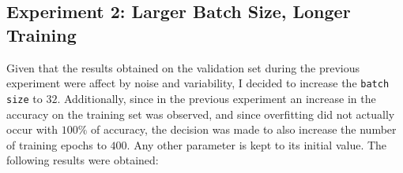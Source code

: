 \documentclass[11pt,a4paper]{article}
\begin{document}
\subsection{Experiment 2: Larger Batch Size, Longer Training}
Given that the results obtained on the validation set during the previous experiment were affect by noise and variability, I decided to increase the \texttt{batch size} to $32$. Additionally, since in the previous experiment an increase in the accuracy on the training set was observed, and since overfitting did not actually occur with $100\%$ of accuracy, the decision was made to also increase the number of training epochs to $400$. Any other parameter is kept to its initial value. The following results were obtained:
\begin{figure}[H]
    \centering
    \qquad

\end{figure}
\end{document}
